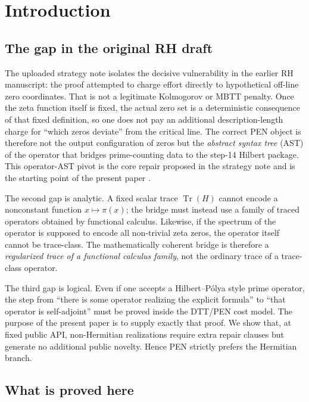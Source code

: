 \documentclass[11pt,a4paper]{article}
\theoremstyle{plain}
\theoremstyle{definition}
\theoremstyle{remark}
\newcommand{\Tr}{\operatorname{Tr}}
\begin{document}
\tableofcontents
\clearpage

\section{Introduction}

\subsection{The gap in the original RH draft}

The uploaded strategy note isolates the decisive vulnerability in the earlier RH manuscript: the proof attempted to charge effort directly to hypothetical off-line zero coordinates. That is not a legitimate Kolmogorov or MBTT penalty. Once the zeta function itself is fixed, the actual zero set is a deterministic consequence of that fixed definition, so one does not pay an additional description-length charge for ``which zeros deviate'' from the critical line. The correct PEN object is therefore not the output configuration of zeros but the \emph{abstract syntax tree} (AST) of the operator that bridges prime-counting data to the step-14 Hilbert package. This operator-AST pivot is the core repair proposed in the strategy note and is the starting point of the present paper \citep{rhstrategy}.

The second gap is analytic. A fixed scalar trace $\Tr(H)$ cannot encode a nonconstant function $x \mapsto \pi(x)$; the bridge must instead use a family of traced operators obtained by functional calculus. Likewise, if the spectrum of the operator is supposed to encode all non-trivial zeta zeros, the operator itself cannot be trace-class. The mathematically coherent bridge is therefore a \emph{regularized trace of a functional calculus family}, not the ordinary trace of a trace-class operator.

The third gap is logical. Even if one accepts a Hilbert--P\'olya style prime operator, the step from ``there is some operator realizing the explicit formula'' to ``that operator is self-adjoint'' must be proved inside the DTT/PEN cost model. The purpose of the present paper is to supply exactly that proof. We show that, at fixed public API, non-Hermitian realizations require extra repair clauses but generate no additional public novelty. Hence PEN strictly prefers the Hermitian branch.

\subsection{What is proved here}
\end{document}
